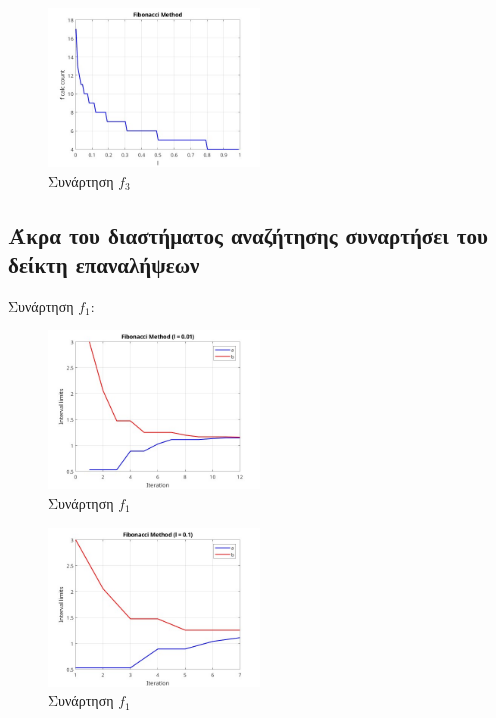 \begin{figure}[H] %
    \centering
    \includegraphics[width=0.5\textwidth]{media/fibonaccif3} %
    \caption{Συνάρτηση $f_3$}
\end{figure}
\subsection{Άκρα του διαστήματος αναζήτησης συναρτήσει του δείκτη επαναλήψεων}
Συνάρτηση $f_1$:
\begin{figure}[H] %
    \centering
    \includegraphics[width=0.5\textwidth]{media/fibonaccif1_001} %
    \caption{Συνάρτηση $f_1$}
\end{figure}
\begin{figure}[H] %
    \centering
    \includegraphics[width=0.5\textwidth]{media/fibonaccif1_01} %
    \caption{Συνάρτηση $f_1$}
\end{figure}
